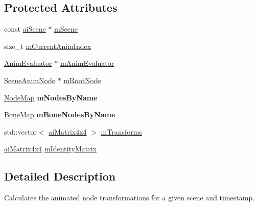 \subsection*{Protected Attributes}
\begin{DoxyCompactItemize}
\item 
const \hyperlink{structai_scene}{ai\+Scene} $\ast$ \hyperlink{class_assimp_view_1_1_scene_animator_a4fe1542596fc5b5287fc2ad54d486379}{m\+Scene}
\item 
size\+\_\+t \hyperlink{class_assimp_view_1_1_scene_animator_a4305f48bc7e66229f416838f0b8e49b0}{m\+Current\+Anim\+Index}
\item 
\hyperlink{class_assimp_view_1_1_anim_evaluator}{Anim\+Evaluator} $\ast$ \hyperlink{class_assimp_view_1_1_scene_animator_a833e91d8a9b56837f20d0c80100ff63a}{m\+Anim\+Evaluator}
\item 
\hyperlink{struct_assimp_view_1_1_scene_anim_node}{Scene\+Anim\+Node} $\ast$ \hyperlink{class_assimp_view_1_1_scene_animator_a37b1c60f39ab41656731cd90b0597f13}{m\+Root\+Node}
\item 
\hypertarget{class_assimp_view_1_1_scene_animator_a0bdeecf52b4d49e7e17540d0ca77bb1b}{\hyperlink{class_assimp_view_1_1_scene_animator_aa14c2ffd5c92d72e07905ce9a7f43c36}{Node\+Map} {\bfseries m\+Nodes\+By\+Name}}\label{class_assimp_view_1_1_scene_animator_a0bdeecf52b4d49e7e17540d0ca77bb1b}

\item 
\hypertarget{class_assimp_view_1_1_scene_animator_a421583430dbf68057ef49927067ea166}{\hyperlink{class_assimp_view_1_1_scene_animator_a0d705443f7c558756e8816763a2777c2}{Bone\+Map} {\bfseries m\+Bone\+Nodes\+By\+Name}}\label{class_assimp_view_1_1_scene_animator_a421583430dbf68057ef49927067ea166}

\item 
std\+::vector$<$ \hyperlink{structai_matrix4x4}{ai\+Matrix4x4} $>$ \hyperlink{class_assimp_view_1_1_scene_animator_a78e94ddc3e4866d76d336bc769aceca8}{m\+Transforms}
\item 
\hyperlink{structai_matrix4x4}{ai\+Matrix4x4} \hyperlink{class_assimp_view_1_1_scene_animator_a76d6c3f6a84b52919ca645f3af7623a5}{m\+Identity\+Matrix}
\end{DoxyCompactItemize}


\subsection{Detailed Description}
Calculates the animated node transformations for a given scene and timestamp.

